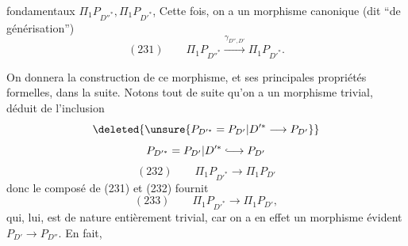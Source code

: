 fondamentaux $\Pi_1P_{D''^{*}},\Pi_1P_{D'^{*}}$, Cette fois, on a un morphisme canonique (dit ``de générisation'')
\[
(231)\qquad \boxed{\Pi_1P_{D''^{*}}\xrightarrow{\gamma_{D'',D'}}\Pi_1P_{D'^{*}}}.
\]

On donnera la  construction de ce morphisme, et ses principales propriétés formelles, dans la suite. Notons tout de suite qu'on a un morphisme trivial, déduit de l'inclusion
\[
\deleted{\unsure{P_{D'^{*}}=P_{D'}\vert D'^{*}\longrightarrow P_{D'}}}
\]
\[
P_{D'^{*}}=P_{D'}\vert D'^{*}\lhook\joinrel\longrightarrow P_{D'}
\]
\[
(232)\qquad\Pi_1P_{D'^{*}}\longrightarrow\Pi_1P_{D'}
\]
donc le composé de (231) et (232) fournit
\[
(233)\qquad\Pi_1P_{D'^{*}}\longrightarrow\Pi_1P_{D'},
\]
qui, lui, est de nature entièrement trivial, car on a en effet un morphisme évident $P_{D'}\longrightarrow P_{D''}$. En fait,
